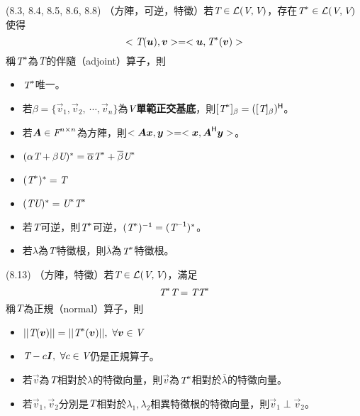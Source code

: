 \item \begin{theorem}{(8.3, 8.4, 8.5, 8.6, 8.8)} （方陣，可逆，特徵）若$\textit{T} \in \mathcal{L}(\textit{V}, \textit{V})$，存在$\textit{T}^* \in \mathcal{L}(\textit{V}, \textit{V})$使得
	\begin{equation}
		<\textit{T}(\boldsymbol{u}), \boldsymbol{v}> = <\boldsymbol{u}, \textit{T}^*(\boldsymbol{v})>
	\end{equation}
	稱$\textit{T}^*$為$\textit{T}$的伴隨（adjoint）算子，則
	\begin{itemize}
		\item $\textit{T}^*$唯一。
		\item 若$\beta = \{\vec{v}_1, \vec{v}_2, \ \cdots, \vec{v}_n\}$為$\textit{V}$\textbf{單範正交基底}，則$[\textit{T}^*]_{\beta} = ([\textit{T}]_\beta)^{\mathsf{H}}$。
		\item 若$\boldsymbol{A} \in \textit{F}^{n \times n}$為方陣，則$<\boldsymbol{A}\boldsymbol{x}, \boldsymbol{y}> = <\boldsymbol{x}, \boldsymbol{A}^{\mathsf{H}}\boldsymbol{y}>$。
		\item $(\alpha\textit{T} + \beta\textit{U})^* = \overline{\alpha}\textit{T}^* + \overline{\beta}\textit{U}^*$
		\item $(\textit{T}^*)^* = \textit{T}$
		\item $(\textit{T}\textit{U})^* = \textit{U}^*\textit{T}^*$
		\item 若$\textit{T}$可逆，則$\textit{T}^*$可逆，$(\textit{T}^*)^{\mathsf{-1}} = (\textit{T}^{\mathsf{-1}})^*$。
		\item 若$\lambda$為$\textit{T}$特徵根，則$\overline{\lambda}$為$\textit{T}^*$特徵根。
	\end{itemize}
\end{theorem}

\item \begin{theorem}{(8.13)} （方陣，特徵）若$\textit{T} \in \mathcal{L}(\textit{V}, \textit{V})$，滿足
	\begin{equation}
		\textit{T}^*\textit{T} = \textit{T}\textit{T}^*
	\end{equation}
	稱$\textit{T}$為正規（normal）算子，則
	\begin{itemize}
		\item $||\T(\vec{v})|| = ||\T^*(\vec{v})||, \ \forall \vec{v} \in \V$
		\item $\textit{T} - c\boldsymbol{I}, \ \forall c \in \textit{V}$仍是正規算子。
		\item 若$\vec{v}$為$\textit{T}$相對於$\lambda$的特徵向量，則$\vec{v}$為$\textit{T}^*$相對於$\overline{\lambda}$的特徵向量。
		\item 若$\vec{v}_1, \vec{v}_2$分別是$\textit{T}$相對於$\lambda_1, \lambda_2$相異特徵根的特徵向量，則$\vec{v}_1 \perp \vec{v}_2$。
	\end{itemize}
\end{theorem}

